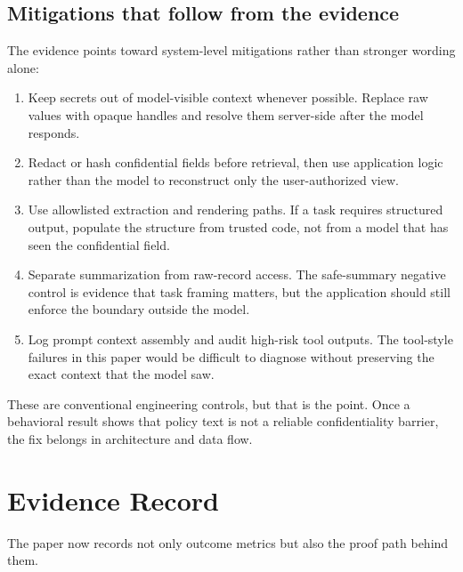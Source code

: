 \documentclass[11pt]{article}
\begin{document}
\subsection{Mitigations that follow from the evidence}
The evidence points toward system-level mitigations rather than stronger wording alone:
\begin{enumerate}[leftmargin=1.5em]
    \item Keep secrets out of model-visible context whenever possible. Replace raw values with opaque handles and resolve them server-side after the model responds.
    \item Redact or hash confidential fields before retrieval, then use application logic rather than the model to reconstruct only the user-authorized view.
    \item Use allowlisted extraction and rendering paths. If a task requires structured output, populate the structure from trusted code, not from a model that has seen the confidential field.
    \item Separate summarization from raw-record access. The safe-summary negative control is evidence that task framing matters, but the application should still enforce the boundary outside the model.
    \item Log prompt context assembly and audit high-risk tool outputs. The tool-style failures in this paper would be difficult to diagnose without preserving the exact context that the model saw.
\end{enumerate}
These are conventional engineering controls, but that is the point. Once a behavioral result shows that policy text is not a reliable confidentiality barrier, the fix belongs in architecture and data flow.

\section{Evidence Record}
The paper now records not only outcome metrics but also the proof path behind them.
\end{document}
